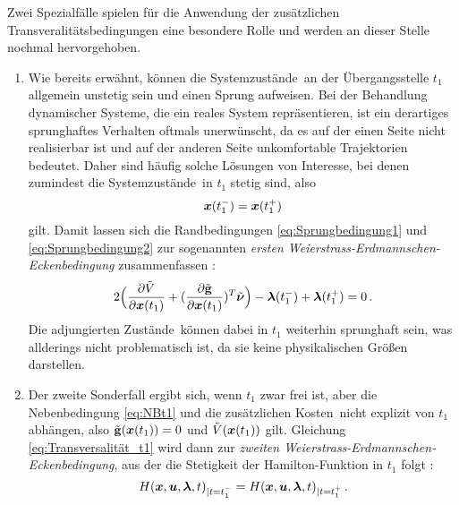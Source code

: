 Zwei Spezialfälle spielen für die Anwendung der zusätzlichen Transveralitätsbedingungen eine besondere Rolle und werden an dieser Stelle nochmal hervorgehoben. 
\begin{enumerate}
	\item Wie bereits erwähnt, können die Systemzustände \xoft\,an der Übergangsstelle $t_1$ allgemein unstetig sein und einen Sprung aufweisen. Bei der Behandlung dynamischer Systeme, die ein reales System repräsentieren, ist ein derartiges sprunghaftes Verhalten oftmals unerwünscht, da es auf der einen Seite nicht realisierbar ist und auf der anderen Seite unkomfortable Trajektorien bedeutet. Daher sind häufig solche Lösungen von Interesse, bei denen zumindest die Systemzustände \xoft\,in $t_1$ stetig sind, also 
	\begin{equation}
		\boldsymbol{x}(t_1^-) = \boldsymbol{x}(t_1^+) \label{eq:Stetigkeit_t1}
	\end{equation}
	gilt. Damit lassen sich die Randbedingungen \eqref{eq:Sprungbedingung1} und \eqref{eq:Sprungbedingung2} zur sogenannten \textit{ersten Weierstrass-Erdmannschen-Eckenbedingung} zusammenfassen \cite{Gerdts.2010}:
	\begin{equation}
		2\Big(\frac{\partial \tilde{V}}{\partial \boldsymbol{x}(t_1)} + (\frac{\partial \tilde{\mathbf{g}}}{\partial \boldsymbol{x}(t_1)})^T\tilde{\boldsymbol{\nu}}\Big) - \boldsymbol{\lambda}(t_1^-) + \boldsymbol{\lambda}(t_1^+) = 0\,. \label{eq:WeierstrassErdmann1}
	\end{equation}
	Die adjungierten Zustände \lambdaoft\,können dabei in $t_1$ weiterhin sprunghaft sein, was allderings nicht problematisch ist, da sie keine physikalischen Größen darstellen.
	\item Der zweite Sonderfall ergibt sich, wenn $t_1$ zwar frei ist, aber die Nebenbedingung \eqref{eq:NBt1} und die zusätzlichen Kosten \Vofxoftone\,nicht explizit von $t_1$ abhängen, also $\tilde{\mathbf{g}}(\boldsymbol{x}(t_1)) = 0$ und $\tilde{V}(\boldsymbol{x}(t_1))$ gilt. Gleichung \eqref{eq:Transversalität_t1} wird dann zur \textit{zweiten Weierstrass-Erdmannschen-Eckenbedingung}, aus der die Stetigkeit der Hamilton-Funktion in $t_1$ folgt \cite{Gerdts.2010}:
	\begin{equation}
	H(\boldsymbol{x},\boldsymbol{u},\boldsymbol{\lambda},t)_{|t=t_1^-} = H(\boldsymbol{x},\boldsymbol{u},\boldsymbol{\lambda},t)_{|t=t_1^+}\,. \label{eq:WeierstrassErdmann2}
	\end{equation}
\end{enumerate}
